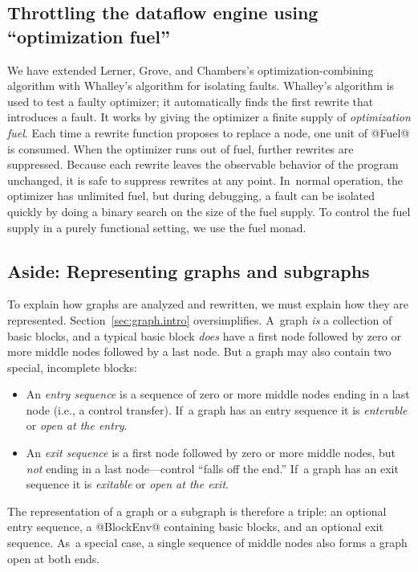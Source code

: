 \documentclass[blockstyle,preprint,natbib,nocopyrightspace]{sigplanconf}
\newcommand\secref[1]{Section~\ref{sec:#1}}
\newcommand\seclabel[1]{\label{sec:#1}}
\begin{document}

\subsection{Throttling the dataflow engine using ``optimization
  fuel''}

\seclabel{vpoiso}

We have extended Lerner, Grove, and Chambers's optimization-combining algorithm with
Whalley's \citeyearpar{whalley:isolation} algorithm for isolating
faults.
Whalley's algorithm is used to test a faulty optimizer;
it automatically
finds the first rewrite that introduces a fault.
It works by giving the optimizer a finite supply of \emph{optimization
fuel}.
Each time a rewrite function proposes to replace a node, one unit of @Fuel@ is
consumed.
When the optimizer runs out of fuel, further rewrites are suppressed.
Because each rewrite leaves the observable behavior of the
program unchanged, it is safe to suppress rewrites at
any point.
In~normal operation, the optimizer has unlimited fuel, but during
debugging, a fault can be isolated quickly by doing a binary search on
the size of the fuel supply.
To control the fuel supply in a purely functional setting, we use
the fuel monad.


\subsection{Aside: Representing graphs and subgraphs}

\seclabel{subgraphs}

To explain how graphs are analyzed and rewritten, we must explain how
they are represented.
\secref{graph.intro} oversimplifies.
A~graph \emph{is} a collection of basic blocks, 
and a typical basic block \emph{does} have a first node followed by zero or
more middle nodes followed by a last node.
But a graph may also contain two special, incomplete
blocks:
\begin{itemize}
\item
An \emph{entry sequence} is a sequence of zero or more middle nodes
ending in a last node (i.e., a control transfer).
If~a graph has an entry sequence it is \emph{enterable} or
\emph{open at the entry}.
\item
An \emph{exit sequence} is a first node followed by zero or more
middle nodes, but \emph{not} ending in a last node---control ``falls
off the end.''
If~a graph has an exit sequence it is \emph{exitable} or
\emph{open at the exit}.
\end{itemize}
The representation of a graph or a subgraph is therefore a triple:
an optional entry sequence, a @BlockEnv@ containing basic blocks,
and an optional exit sequence.
As~a special case, a single sequence of middle nodes also forms a
graph open at both ends.
\end{document}
